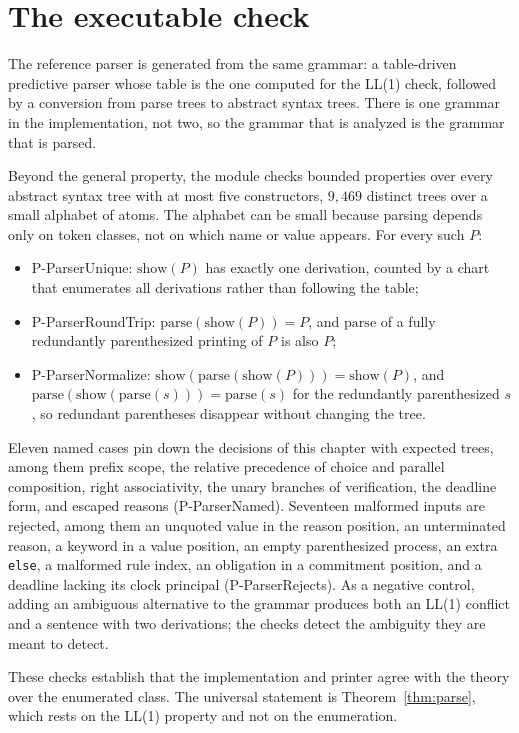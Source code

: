 \documentclass[11pt,openany]{book}
\theoremstyle{remark}
\begin{document}
\section{The executable check}

The reference parser is generated from the same grammar: a table-driven
predictive parser whose table is the one computed for the LL(1) check,
followed by a conversion from parse trees to abstract syntax trees. There
is one grammar in the implementation, not two, so the grammar that is
analyzed is the grammar that is parsed.

Beyond the general property, the module checks bounded properties over
every abstract syntax tree with at most five constructors, $9{,}469$
distinct trees over a small alphabet of atoms. The alphabet can be small
because parsing depends only on token classes, not on which name or value
appears. For every such $P$:
\begin{itemize}[leftmargin=1.5em]
\item P-ParserUnique: $\mathrm{show}(P)$ has exactly one derivation,
counted by a chart that enumerates all derivations rather than following
the table;
\item P-ParserRoundTrip: $\mathrm{parse}(\mathrm{show}(P))=P$, and
$\mathrm{parse}$ of a fully redundantly parenthesized printing of $P$ is
also $P$;
\item P-ParserNormalize: $\mathrm{show}(\mathrm{parse}(\mathrm{show}(P)))
=\mathrm{show}(P)$, and $\mathrm{parse}(\mathrm{show}(\mathrm{parse}(s)))
=\mathrm{parse}(s)$ for the redundantly parenthesized $s$, so redundant
parentheses disappear without changing the tree.
\end{itemize}
Eleven named cases pin down the decisions of this chapter with expected
trees, among them prefix scope, the relative precedence of choice and
parallel composition, right associativity, the unary branches of
verification, the deadline form, and escaped reasons (P-ParserNamed).
Seventeen malformed inputs are rejected, among them an unquoted value in
the reason position, an unterminated reason, a keyword in a value
position, an empty parenthesized process, an extra \texttt{else}, a
malformed rule index, an obligation in a commitment position, and a
deadline lacking its clock principal (P-ParserRejects). As a negative
control, adding an ambiguous alternative to the grammar produces both an
LL(1) conflict and a sentence with two derivations; the checks detect the
ambiguity they are meant to detect.

These checks establish that the implementation and printer agree with the
theory over the enumerated class. The universal statement is
Theorem~\ref{thm:parse}, which rests on the LL(1) property and not on the
enumeration.
\end{document}
